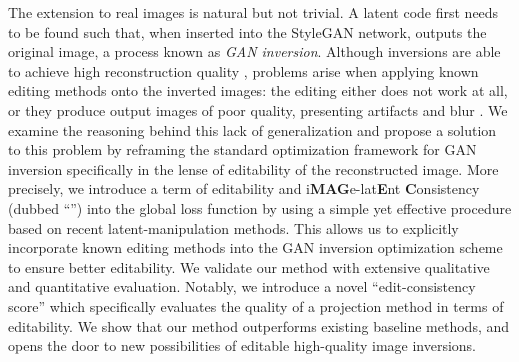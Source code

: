 
The extension to real images is natural but not trivial. A latent code first needs to be 
found such that, when inserted into the StyleGAN network, outputs the original image, a process
known as \emph{GAN inversion}.
Although inversions are able to achieve high reconstruction quality  
\citep{abdal2019image2stylegan, abdal2020}, problems arise when applying known editing methods 
onto the inverted images: the editing either does not work at all, or they produce output 
images of poor quality, presenting artifacts and blur \citep{zhu2020indomain, StyleGAN3D}. 
 We examine the reasoning behind this lack of generalization and propose a solution to this problem 
 by reframing the standard optimization framework for GAN inversion specifically in the lense of 
 editability of the reconstructed image. More precisely, we introduce a term of editability
 and i\textbf{MAG}e-lat\textbf{E}nt \textbf{C}onsistency (dubbed ``\magec'') into the global 
 loss function by using a simple yet effective procedure based on recent latent-manipulation methods.
 This allows us to explicitly incorporate 
 known editing methods into the GAN inversion optimization scheme to ensure better editability. 
We validate our method with extensive qualitative and quantitative evaluation. Notably, we 
introduce a novel ``edit-consistency score'' which specifically evaluates the quality of a projection
method in terms of editability. We show that our method outperforms existing baseline methods, and
 opens the door to new possibilities of editable high-quality image inversions.

